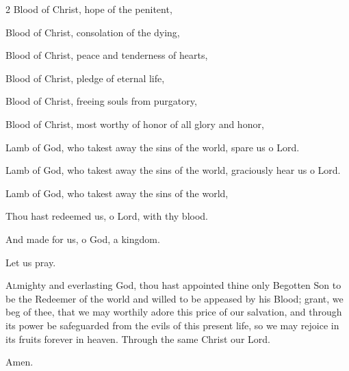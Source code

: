 \begin{enpars}
\begin{multicols}{2}
Blood of Christ, hope of the penitent,

Blood of Christ, consolation of the dying,

Blood of Christ, peace and tenderness of hearts,

Blood of Christ, pledge of eternal life,

Blood of Christ, freeing souls from purgatory,

Blood of Christ, most worthy of honor of all glory and honor,

Lamb of God, who takest away
the sins of the world, 
spare us o Lord.

Lamb of God, who takest away
the sins of the world, 
graciously hear us o Lord.

Lamb of God, who takest away
the sins of the world, 
\end{multicols}

\vv Thou hast redeemed us, o Lord, with thy blood.

\rr And made for us, o God, a kingdom.

Let us pray.

\lettrine{A}{l}mighty and everlasting God, thou hast appointed thine only Begotten Son
to be the Redeemer of the world and willed to be appeased by his Blood; grant, we beg of thee,
that we may worthily adore this price of our salvation, and through its power be safeguarded from the evils
of this present life, so we may rejoice in its fruits forever in heaven.
Through the same Christ our Lord.

\rr Amen.

\end{enpars}